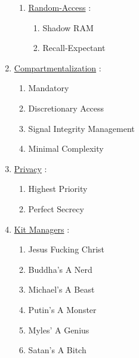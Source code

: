 \documentclass[11pt]{article}
\begin{document}
\begin{enumerate}
\begin{enumerate}
		\item[] \ul{Random-Access} :
		\begin{enumerate}
			\item[] Shadow RAM
			\item[] Recall-Expectant
		\end{enumerate}
	\end{enumerate}

	\item[] \ul{Compartmentalization} :
	\begin{enumerate}
		\item[] Mandatory
		\item[] Discretionary Access
		\item[] Signal Integrity Management
		\item[] Minimal Complexity
	\end{enumerate}

	\item[] \ul{Privacy} :
	\begin{enumerate}
		\item[] Highest Priority
		\item[] Perfect Secrecy
	\end{enumerate}

	\item[] \ul{Kit Managers} :
	\begin{enumerate}
		\item[] Jesus Fucking Christ
		\item[] Buddha's A Nerd
		\item[] Michael's A Beast
		\item[] Putin's A Monster
		\item[] Myles' A Genius
		\item[] Satan's A Bitch
	\end{enumerate}

\end{enumerate}
\end{document}
